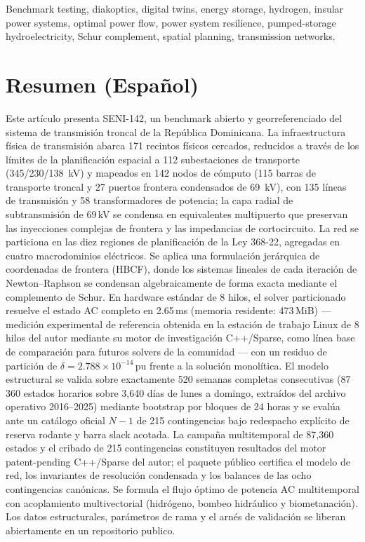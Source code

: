 \documentclass[11pt, journal, onecolumn]{IEEEtran}
\begin{document}
\begin{IEEEkeywords}
Benchmark testing, diakoptics, digital twins, energy storage, hydrogen, insular power systems, optimal power flow, power system resilience, pumped-storage hydroelectricity, Schur complement, spatial planning, transmission networks.
\end{IEEEkeywords}

\vspace{6pt}
\section*{Resumen (Espa\~nol)}
\noindent Este artículo presenta SENI-142, un benchmark abierto y georreferenciado del sistema de transmisión troncal de la República Dominicana. La infraestructura física de transmisión abarca 171 recintos físicos cercados, reducidos a través de los límites de la planificación espacial a 112 subestaciones de transporte (345/230/138~kV) y mapeados en 142 nodos de cómputo (115 barras de transporte troncal y 27 puertos frontera condensados de 69~kV), con 135 líneas de transmisión y 58 transformadores de potencia; la capa radial de subtransmisión de 69\,kV se condensa en equivalentes multipuerto que preservan las inyecciones complejas de frontera y las impedancias de cortocircuito. La red se particiona en las diez regiones de planificación de la Ley 368-22, agregadas en cuatro macrodominios eléctricos. Se aplica una formulación jerárquica de coordenadas de frontera (HBCF), donde los sistemas lineales de cada iteración de Newton--Raphson se condensan algebraicamente de forma exacta mediante el complemento de Schur. En hardware estándar de 8 hilos, el solver particionado resuelve el estado AC completo en 2.65\,ms (memoria residente: 473\,MiB) --- medición experimental de referencia obtenida en la estación de trabajo Linux de 8 hilos del autor mediante su motor de investigación C++/Sparse, como línea base de comparación para futuros solvers de la comunidad --- con un residuo de partición de $\delta = 2.788 \times 10^{-14}$\,pu frente a la solución monolítica. El modelo estructural se valida sobre exactamente 520 semanas completas consecutivas (87\,360 estados horarios sobre 3,640 días de lunes a domingo, extraídos del archivo operativo 2016--2025) mediante bootstrap por bloques de 24 horas y se evalúa ante un catálogo oficial $N-1$ de 215 contingencias bajo redespacho explícito de reserva rodante y barra slack acotada. La campaña multitemporal de 87,360 estados y el cribado de 215 contingencias constituyen resultados del motor patent-pending C++/Sparse del autor; el paquete público certifica el modelo de red, los invariantes de resolución condensada y los balances de las ocho contingencias canónicas. Se formula el flujo óptimo de potencia AC multitemporal con acoplamiento multivectorial (hidrógeno, bombeo hidráulico y biometanación). Los datos estructurales, parámetros de rama y el arnés de validación se liberan abiertamente en un repositorio publico.
\end{document}
